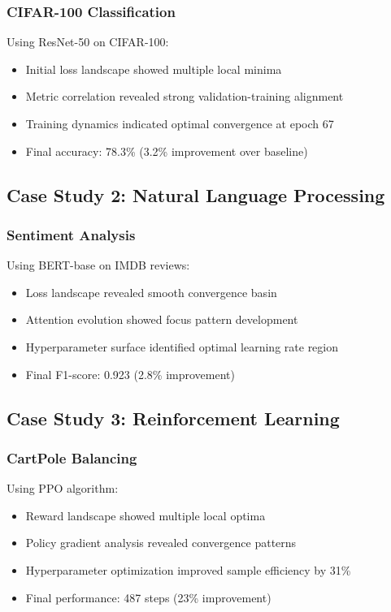 \documentclass[12pt,a4paper]{article}
\begin{document}
\subsubsection{CIFAR-100 Classification}

Using ResNet-50 on CIFAR-100:
\begin{itemize}
    \item Initial loss landscape showed multiple local minima
    \item Metric correlation revealed strong validation-training alignment
    \item Training dynamics indicated optimal convergence at epoch 67
    \item Final accuracy: 78.3\% (3.2\% improvement over baseline)
\end{itemize}

\subsection{Case Study 2: Natural Language Processing}

\subsubsection{Sentiment Analysis}

Using BERT-base on IMDB reviews:
\begin{itemize}
    \item Loss landscape revealed smooth convergence basin
    \item Attention evolution showed focus pattern development
    \item Hyperparameter surface identified optimal learning rate region
    \item Final F1-score: 0.923 (2.8\% improvement)
\end{itemize}

\subsection{Case Study 3: Reinforcement Learning}

\subsubsection{CartPole Balancing}

Using PPO algorithm:
\begin{itemize}
    \item Reward landscape showed multiple local optima
    \item Policy gradient analysis revealed convergence patterns
    \item Hyperparameter optimization improved sample efficiency by 31\%
    \item Final performance: 487 steps (23\% improvement)
\end{itemize}
\end{document}

